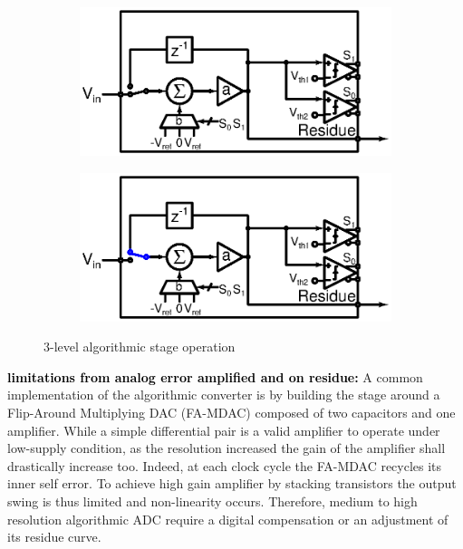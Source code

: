 \begin{figure}[htp]
	\centering
	\begin{subfigure}[b]{0.48\textwidth}
		\centering
		\includegraphics[width=\textwidth]{Chapter4/Figs/algorithmic-principle-new_sample.ps}
		\label{fig:algo-alone-reset-clk-cycle}
	\end{subfigure}
	\begin{subfigure}[b]{0.48\textwidth}
		\centering
		\includegraphics[width=\textwidth]{Chapter4/Figs/algorithmic-principle.ps}
		\label{fig:algo-alone-std-clk-cycle}
	\end{subfigure}
	\caption{3-level algorithmic stage operation}
	\label{fig:algo-alone-clk-cycle}
\end{figure}

\textbf{\textcolor{black}{limitations from analog error amplified and on residue:}}
A common implementation of the algorithmic converter is by building the stage around a Flip-Around Multiplying DAC (FA-MDAC) composed of two capacitors and one amplifier. While a simple differential pair is a valid amplifier to operate under low-supply condition, as the resolution increased the gain of the amplifier shall drastically increase too. Indeed, at each clock cycle the FA-MDAC recycles its inner self error. To achieve high gain amplifier by stacking transistors the output swing is thus limited and non-linearity occurs. Therefore, medium to high resolution algorithmic ADC require a digital compensation or an adjustment of its residue curve.

